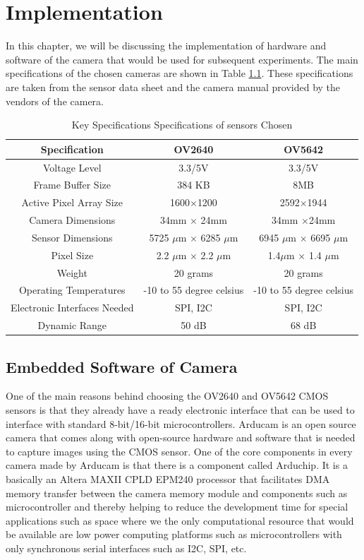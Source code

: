 \chapter{Implementation}
In this chapter, we will be discussing the implementation of hardware and software of the camera that would be used for subsequent experiments.
The main specifications of the chosen cameras are shown in Table \ref{tbl:camera_specs}. These specifications are taken from the sensor data sheet and the camera manual provided by the vendors of the camera\cite{OV2640Arducam}\cite{OV5642Arducam}\cite{OV2640DS}\cite{OV5642DS}.  
\begin{table}[]
\centering
\caption{ Key Specifications Specifications of sensors Chosen}
\label{tbl:camera_specs}
\begin{tabular}{|c|c|c|}
\hline
Specification & OV2640 &  OV5642 \\
\hline
Voltage Level & 3.3/5V &  3.3/5V\\
 \hline
Frame Buffer Size & 384 KB & 8MB \\
 \hline
 Active Pixel Array Size& 1600$\times$1200&  2592$\times$1944 \\
 \hline  
 Camera Dimensions & 34mm $\times$ 24mm & 34mm $\times$24mm\\
 \hline
 Sensor Dimensions & 5725 $\mu$m $\times$ 6285 $\mu$m& 6945 $\mu$m $\times$ 6695 $\mu$m\\
 \hline
 Pixel Size & 2.2 $\mu$m $\times$ 2.2 $\mu$m & 1.4$\mu$m $\times$ 1.4 $\mu$m\\
 \hline
 Weight & 20 grams & 20 grams \\
 \hline
 Operating Temperatures & -10 to 55 degree celsius & -10 to 55 degree celsius \\
 \hline
 Electronic Interfaces Needed & SPI, I2C & SPI, I2C\\
 \hline
 Dynamic Range & 50 dB & 68 dB \\
 \hline
\end{tabular}
\end{table}
\section{Embedded Software of Camera}
One of the main reasons behind choosing the OV2640 and OV5642 CMOS sensors is that they already have a ready electronic interface that can be used to interface with standard 8-bit/16-bit microcontrollers. Arducam is an open source camera that comes along with open-source hardware and software that is needed to capture images using the CMOS sensor. One of the core components in every camera made by Arducam is that there is a component called Arduchip\cite{Arduchip}. It is a basically an Altera MAXII CPLD EPM240 processor that facilitates DMA memory transfer between the camera memory module and components such as microcontroller and thereby helping to reduce the development time for special applications such as space where we the only computational resource that would be available are low power computing platforms such as microcontrollers with only synchronous serial interfaces such as I2C, SPI, etc. 


